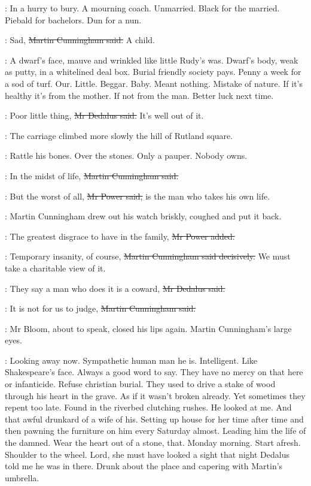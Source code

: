 \BloomInt:
In a hurry to bury.
A mourning coach.
Unmarried.
Black for the married.
Piebald for bachelors.
Dun for a nun.

\cunningham:
Sad,
\sout{Martin Cunningham said.}
A child.

\BloomInt:
A dwarf's face, mauve and wrinkled like little Rudy's was.
Dwarf's body, weak as putty, in a whitelined deal box.
Burial friendly society pays.
Penny a week for a sod of turf.
Our.
Little.
Beggar.
Baby.
Meant nothing.
Mistake of nature.
If it's healthy it's from the mother.
If not from the man.
Better luck next time.

\simon:
Poor little thing,
\sout{Mr Dedalus said.}
It's well out of it.

:
The carriage climbed more slowly the hill of Rutland square.

\BloomInt:
Rattle his bones.
Over the stones.
Only a pauper.
Nobody owns.

\cunningham:
In the midst of life,
\sout{Martin Cunningham said.}

\power:
But the worst of all,
\sout{Mr Power said,}
is the man who takes his own life.

:
Martin Cunningham drew out his watch briskly,
coughed and put it back.

\power:
The greatest disgrace to have in the family,
\sout{Mr Power added.}

\cunningham:
Temporary insanity, of course,
\sout{Martin Cunningham said decisively.}
We must take a charitable view of it.

\simon:
They say a man who does it is a coward,
\sout{Mr Dedalus said.}

\cunningham:
It is not for us to judge,
\sout{Martin Cunningham said.}

:
Mr Bloom, about to speak, closed his lips again.
Martin Cunningham's large eyes.

\BloomInt:
Looking away now.
Sympathetic human man he is.
Intelligent.
Like Shakespeare's face.
Always a good word to say.
They have no mercy on that here or infanticide.
Refuse christian burial.
They used to drive a stake of wood through his heart in the grave.
As if it wasn't broken already.
Yet sometimes they repent too late.
Found in the riverbed clutching rushes.
He looked at me.
And that awful drunkard of a wife of his.
Setting up house for her time after time
and then pawning the furniture on him every Saturday almost.
Leading him the life of the damned.
Wear the heart out of a stone, that.
Monday morning.
Start afresh.
Shoulder to the wheel.
Lord, she must have looked a sight that night Dedalus told me he was in there.
Drunk about the place and capering with Martin's umbrella.

